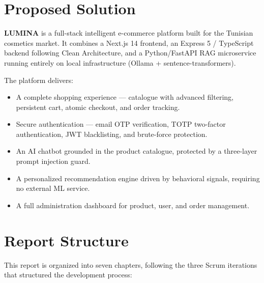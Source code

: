 \section*{Proposed Solution}

\textbf{LUMINA} is a full-stack intelligent e-commerce platform built for the
Tunisian cosmetics market.
It combines a Next.js 14 frontend, an Express 5 / TypeScript backend following
Clean Architecture, and a Python/FastAPI RAG microservice running entirely
on local infrastructure (Ollama + sentence-transformers).

The platform delivers:
\begin{itemize}
  \item A complete shopping experience --- catalogue with advanced filtering,
        persistent cart, atomic checkout, and order tracking.
  \item Secure authentication --- email OTP verification, TOTP two-factor
        authentication, JWT blacklisting, and brute-force protection.
  \item An AI chatbot grounded in the product catalogue, protected by a
        three-layer prompt injection guard.
  \item A personalized recommendation engine driven by behavioral signals,
        requiring no external ML service.
  \item A full administration dashboard for product, user, and order management.
\end{itemize}

\section*{Report Structure}

This report is organized into seven chapters, following the three Scrum
iterations that structured the development process:

